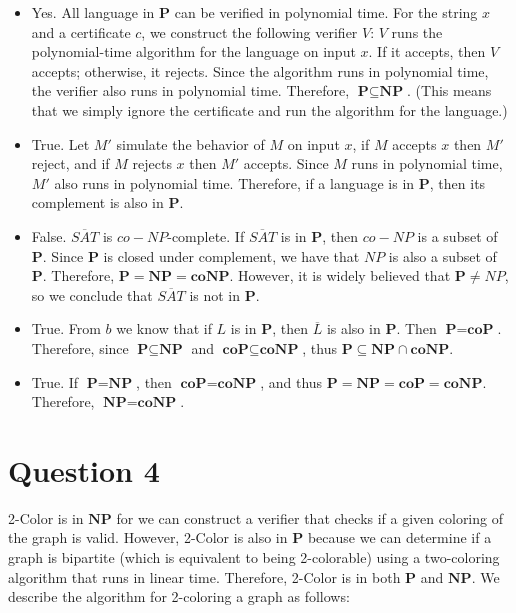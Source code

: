 \documentclass[a4paper, UTF-8]{article}
\theoremstyle{plain}
\begin{document}
\begin{itemize}
  \item[a.] Yes. All language in $\textbf{P}$ can be verified in polynomial time. For the string $x$ and a certificate $c$, we construct the following verifier $V$: $V$ runs the polynomial-time algorithm for the language on input $x$. If it accepts, then $V$ accepts; otherwise, it rejects. Since the algorithm runs in polynomial time, the verifier also runs in polynomial time. Therefore, $\textbf{P} \subseteq \textbf{NP}$. (This means that we simply ignore the certificate and run the algorithm for the language.) 
  \item[b.] True. Let $M'$ simulate the behavior of $M$ on input $x$, if $M$ accepts $x$ then $M'$ reject, and if $M$ rejects $x$ then $M'$ accepts. Since $M$ runs in polynomial time, $M'$ also runs in polynomial time. Therefore, if a language is in $\textbf{P}$, then its complement is also in $\textbf{P}$.
  \item[c.] False. $\overline{SAT}$ is $co-NP$-complete. If $\overline{SAT}$ is in $\textbf{P}$, then $co-NP$ is a subset of $\textbf{P}$. Since $\textbf{P}$ is closed under complement, we have that $NP$ is also a subset of $\textbf{P}$. Therefore, $\textbf{P} = \textbf{NP} = \textbf{coNP}$. However, it is widely believed that $\textbf{P} \neq NP$, so we conclude that $\overline{SAT}$ is not in $\textbf{P}$.
  \item[d.] True. From $b$ we know that if $L$ is in $\textbf{P}$, then $\overline{L}$ is also in $\textbf{P}$. Then $\textbf{P} = \textbf{coP}$. Therefore, since $\textbf{P} \subseteq \textbf{NP}$ and $\textbf{coP} \subseteq \textbf{coNP}$, thus $\textbf{P} \subseteq \textbf{NP} \cap \textbf{coNP}$. 
  \item[e.] True. If $\textbf{P} = \textbf{NP}$, then $\textbf{coP} = \textbf{coNP}$, and thus $\textbf{P} = \textbf{NP} = \textbf{coP} = \textbf{coNP}$. Therefore, $\textbf{NP} = \textbf{coNP}$.
\end{itemize}

\section{Question 4} 

2-Color is in $\textbf{NP}$ for we can construct a verifier that checks if a given coloring of the graph is valid. However, 2-Color is also in $\textbf{P}$ because we can determine if a graph is bipartite (which is equivalent to being 2-colorable) using a two-coloring algorithm that runs in linear time. Therefore, 2-Color is in both $\textbf{P}$ and $\textbf{NP}$. We describe the algorithm for 2-coloring a graph as follows:
\end{document}
